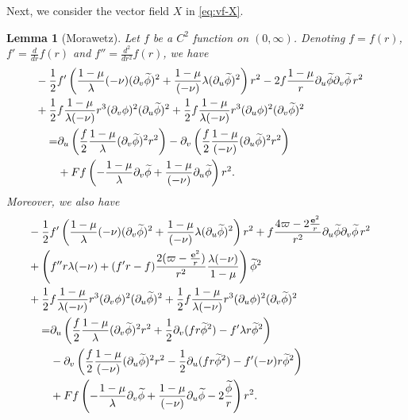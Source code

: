 \documentclass[10pt, reqno]{amsart}
\newtheorem{lemma}[theorem]{Lemma}
\theoremstyle{definition}
\theoremstyle{remark}
\theoremstyle{conjecture}
\numberwithin{equation}{section}
\newcommand{\rd}{\partial}
\newcommand{\0}{\emptyset}
\newcommand{\lmb}{\lambda}
\newcommand{\bfe}{{\bf e}}
\newcommand{\dur}{\nu}
\newcommand{\dvr}{\lmb}
\newcommand{\f}{\frac}
\newcommand{\e}{\bfe}							%
\newcommand{\phibg}{\overline{\phi}}				%
\newcommand{\phidf}{\widetilde{\phi}}				%
\begin{document}
Next, we consider the vector field $X$ in \eqref{eq:vf-X}.
\begin{lemma} [Morawetz] \label{lem:morawetz}
Let $f$ be a $C^{2}$ function on $(0, \infty)$. Denoting $f=f(r)$, $f'=\f{d}{dr}f(r)$ and $f''=\f{d^2}{dr^2}f(r)$, we have
\begin{equation} \label{eq:en-id-X0}
\begin{aligned}
& \hskip-2em
	- \frac{1}{2} f' \left( \frac{1-\mu}{\dvr} (-\dur) (\rd_{v} \phidf)^{2}  + \frac{1-\mu}{(-\dur)} \dvr (\rd_{u} \phidf)^{2}  \right) r^{2} 
	- 2 f \frac{1-\mu}{r}  \rd_{u} \phidf \rd_{v} \phidf \, r^{2} \\
& \hskip-2em
	+ \frac{1}{2} f \frac{1-\mu}{\dvr (-\dur)}  r^{3} (\rd_{v} \phi)^{2} (\rd_{u} \phidf)^{2} 
	+ \frac{1}{2} f \frac{1-\mu}{\dvr (-\dur)}  r^{3} (\rd_{u} \phi)^{2} (\rd_{v} \phidf)^{2} \\
	= & \rd_{u} \left( \frac{f}{2} \frac{1-\mu}{\dvr} (\rd_{v} \phidf)^{2} r^{2} \right) 
		- \rd_{v} \left( \frac{f}{2} \frac{1-\mu}{(-\dur)} (\rd_{u} \phidf)^{2} r^{2} \right) \\
	& + F f \left( - \frac{1-\mu}{\dvr} \rd_{v} \phidf + \frac{1-\mu}{(-\dur)} \rd_{u} \phidf \right) r^{2}  .
\end{aligned}
\end{equation}
Moreover, we also have
\begin{equation} \label{eq:en-id-X}
\begin{aligned}
& \hskip-2em
	- \frac{1}{2} f' \left( \frac{1-\mu}{\dvr} (-\dur) (\rd_{v} \phidf)^{2} + \frac{1-\mu}{(-\dur)} \dvr (\rd_{u} \phidf)^{2} \right) r^{2} 
	+ f \frac{4 \varpi - 2 \frac{\e^{2}}{r}}{r^{2}} \rd_{u} \phidf \rd_{v} \phidf \, r^{2} \\
& \hskip-2em
	+ \left( f'' r \dvr (-\dur) 
	+ (f' r - f) \frac{2 (\varpi - \frac{\e^{2}}{r})}{r^{2}} \frac{\dvr (-\dur)}{1-\mu} \right) \phidf^{2} \\
& \hskip-2em
	+ \frac{1}{2} f \frac{1-\mu}{\dvr (-\dur)}  r^{3} (\rd_{v} \phi)^{2} (\rd_{u} \phidf)^{2} 
	+ \frac{1}{2} f \frac{1-\mu}{\dvr (-\dur)}  r^{3} (\rd_{u} \phi)^{2} (\rd_{v} \phidf)^{2} \\
	= & 
	\rd_{u} \left( \frac{f}{2} \frac{1-\mu}{\dvr} (\rd_{v} \phidf)^{2} r^{2} + \frac{1}{2} \rd_{v}(f r \phidf^{2}) - f' \dvr r \phidf^{2} \right) \\
	& - \rd_{v} \left( \frac{f}{2} \frac{1-\mu}{(-\dur)} (\rd_{u} \phidf)^{2} r^{2} - \frac{1}{2} \rd_{u}(f r \phidf^{2}) - f' (-\dur) r \phidf^{2} \right) \\
	& + F f \left( - \frac{1-\mu}{\dvr} \rd_{v} \phidf + \frac{1-\mu}{(-\dur)} \rd_{u} \phidf - 2 \frac{\phidf}{r} \right) r^{2} .
\end{aligned}
\end{equation}
\end{lemma}
\end{document}
